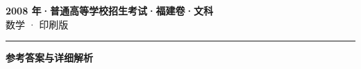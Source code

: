 \documentclass[zihao=5, a4paper]{ctexart}
\begin{document}
\begin{center}
  {\Large\bfseries 2008 年·普通高等学校招生考试·福建卷·文科}\\[4pt]
  {\large 数学 · 印刷版}
\end{center}
\medskip
{}

\par\bigskip\hrule\bigskip
{}
\begin{center}{\large\bfseries 参考答案与详细解析}\end{center}
\smallskip

\end{document}
